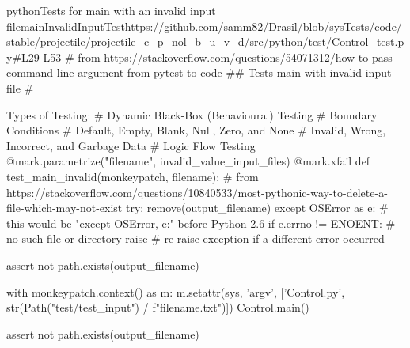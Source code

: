\begin{codeSnippet}{python}{Tests for main with an invalid input file}{mainInvalidInputTest}{https://github.com/samm82/Drasil/blob/sysTests/code/stable/projectile/projectile_c_p_nol_b_u_v_d/src/python/test/Control_test.py\#L29-L53}
  # from https://stackoverflow.com/questions/54071312/how-to-pass-command-line-argument-from-pytest-to-code
  ## \brief Tests main with invalid input file
  # \par Types of Testing:
  # Dynamic Black-Box (Behavioural) Testing
  # Boundary Conditions
  # Default, Empty, Blank, Null, Zero, and None
  # Invalid, Wrong, Incorrect, and Garbage Data
  # Logic Flow Testing
  @mark.parametrize("filename", invalid_value_input_files)
  @mark.xfail
  def test_main_invalid(monkeypatch, filename):
      # from https://stackoverflow.com/questions/10840533/most-pythonic-way-to-delete-a-file-which-may-not-exist
      try:
          remove(output_filename)
      except OSError as e: # this would be "except OSError, e:" before Python 2.6
          if e.errno != ENOENT: # no such file or directory
              raise # re-raise exception if a different error occurred


      assert not path.exists(output_filename)


      with monkeypatch.context() as m:
          m.setattr(sys, 'argv', ['Control.py', str(Path("test/test_input") / f"{filename}.txt")])
          Control.main()
      
      assert not path.exists(output_filename)
\end{codeSnippet}
